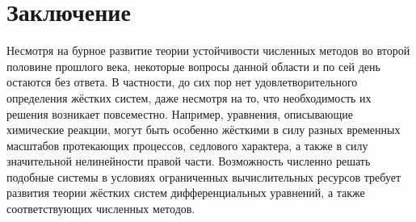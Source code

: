 \chapter{Заключение}
\label{chapter:summary} 

Несмотря на бурное развитие теории устойчивости численных методов во второй половине прошлого века,
некоторые вопросы данной области и по сей день остаются без ответа.
В частности, до сих пор нет удовлетворительного определения жёстких систем,
даже несмотря на то, что необходимость их решения возникает повсеместно.
Например, уравнения, описывающие химические реакции,
могут быть особенно жёсткими в силу разных временных масштабов протекающих процессов, седлового характера,
а также в силу значительной нелинейности правой части.
Возможность численно решать подобные системы в условиях ограниченных вычислительных ресурсов
требует развития теории жёстких систем дифференциальных уравнений,
а также соответствующих численных методов.

